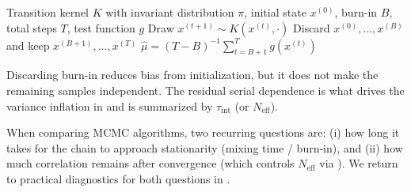 \begin{algorithm}[t]
  \caption{Generic MCMC estimation with burn-in}
  \label{alg:mcmc-burnin}
  \begin{algorithmic}[1]
    \Require Transition kernel $K$ with invariant distribution $\pi$, initial state $x^{(0)}$, burn-in $B$, total steps $T$, test function $g$
      \State Draw $x^{(t+1)} \sim K(x^{(t)},\cdot)$
    \EndFor
    \State Discard $x^{(0)},\dots,x^{(B)}$ and keep $x^{(B+1)},\dots,x^{(T)}$
    \State \Return $\hat\mu = (T-B)^{-1}\sum_{t=B+1}^T g(x^{(t)})$
  \end{algorithmic}
\end{algorithm}

Discarding burn-in reduces bias from initialization, but it does not make the remaining samples independent.
The residual serial dependence is what drives the variance inflation in  and is summarized by $\tau_{\mathrm{int}}$ (or $N_{\mathrm{eff}}$).

When comparing MCMC algorithms, two recurring questions are:
(i) how long it takes for the chain to approach stationarity (mixing time / burn-in), and
(ii) how much correlation remains after convergence (which controls $N_{\mathrm{eff}}$ via ).
We return to practical diagnostics for both questions in .
